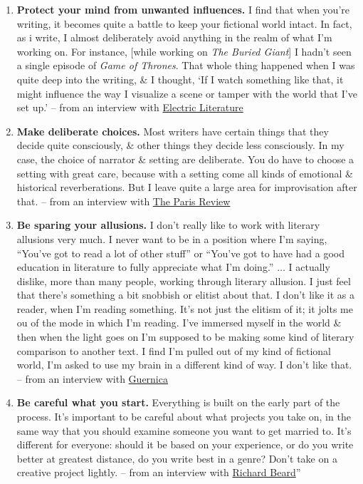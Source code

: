 \documentclass[oneside]{book}
\numberwithin{equation}{section}
\begin{document}
\begin{enumerate}
	\item \textbf{Protect your mind from unwanted influences.} I find that when you're writing, it becomes quite a battle to keep your fictional world intact. In fact, as i write, I almost deliberately avoid anything in the realm of what I'm working on. For instance, [while working on \textit{The Buried Giant}] I hadn't seen a single episode of \textit{Game of Thrones}. That whole thing happened when I was quite deep into the writing, \& I thought, `If I watch something like that, it might influence the way I visualize a scene or tamper with the world that I've set up.' -- from an interview with \href{https://electricliterature.com/a-language-that-conceals-an-interview-with-kazuo-ishiguro-author-of-the-buried-giant-9673849885c7}{Electric Literature}
	\item \textbf{Make deliberate choices.} Most writers have certain things that they decide quite consciously, \& other things they decide less consciously. In my case, the choice of narrator \& setting are deliberate. You do have to choose a setting with great care, because with a setting come all kinds of emotional \& historical reverberations. But I leave quite a large area for improvisation after that. -- from an interview with \href{https://www.theparisreview.org/interviews/5829/kazuo-ishiguro-the-art-of-fiction-no-196-kazuo-ishiguro}{The Paris Review}
	\item \textbf{Be sparing your allusions.} I don't really like to work with literary allusions very much. I never want to be in a position where I'm saying, ``You've got to read a lot of other stuff'' or ``You've got to have had a good education in literature to fully appreciate what I'm doing.'' $\ldots$ I actually dislike, more than many people, working through literary allusion. I just feel that there's something a bit snobbish or elitist about that. I don't like it as a reader, when I'm reading something. It's not just the elitism of it; it jolts me ou of the mode in which I'm reading. I've immersed myself in the world \& then when the light goes on I'm supposed to be making some kind of literary comparison to another text. I find I'm pulled out of my kind of fictional world, I'm asked to use my brain in a different kind of way. I don't like that. -- from an interview with \href{https://www.guernicamag.com/mythic-retreat/}{Guernica}
	\item \textbf{Be careful what you start.} Everything is built on the early part of the process. It's important to be careful about what projects you take on, in the same way that you should examine someone you want to get married to. It's different for everyone: should it be based on your experience, or do you write better at greatest distance, do you write best in a genre? Don't take on a creative project lightly. -- from an interview with \href{https://holdenlee.wordpress.com/2014/02/18/kazuo-ishiguro-on-writing/}{Richard Beard}''
\end{enumerate}
\end{document}
